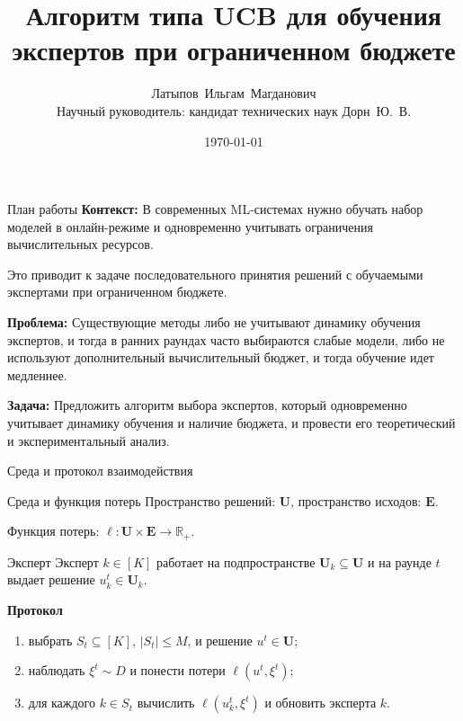 \documentclass[aspectratio=169]{beamer}
\title{Алгоритм типа UCB для обучения экспертов при ограниченном бюджете}
\author{
    Латыпов~Ильгам~Магданович\\
    \vspace{0.2cm}
    {\small Научный руководитель: кандидат технических наук Дорн~Ю.~В.}
}
\institute{
    Кафедра интеллектуальных систем ФПМИ МФТИ\\
    Специализация: Интеллектуальный анализ данных\\
    Направление: Информатика и вычислительная техника
}
\date{\today}
\begin{document}
\begin{frame}
  \titlepage
\end{frame}

\begin{frame}{План работы}
\small
\textbf{Контекст:} В современных ML-системах нужно обучать набор моделей в онлайн-режиме и одновременно учитывать ограничения вычислительных ресурсов.

Это приводит к задаче последовательного принятия решений с обучаемыми экспертами при ограниченном бюджете.

\vspace{0.2cm}
\textbf{Проблема:} Существующие методы либо не учитывают динамику обучения экспертов, и тогда в ранних раундах часто выбираются слабые модели, либо не используют дополнительный вычислительный бюджет, и тогда обучение идет медленнее.

\vspace{0.25cm}
\textbf{Задача:} Предложить алгоритм выбора экспертов, который одновременно учитывает динамику обучения и наличие бюджета, и провести его теоретический и экспериментальный анализ.
\end{frame}

\begin{frame}{Среда и протокол взаимодействия}
\small
\begin{block}{Среда и функция потерь}
Пространство решений: $\mathbf{U}$, пространство исходов: $\mathbf{E}$.

Функция потерь: $\ell:\mathbf{U}\times\mathbf{E}\to\mathbb{R}_+$.
\end{block}

\begin{block}{Эксперт}
Эксперт $k\in[K]$ работает на подпространстве $\mathbf{U}_k\subseteq\mathbf{U}$ и на раунде $t$ выдает решение $u_k^t\in\mathbf{U}_k$.
\end{block}

\begin{nframed}
\textbf{Протокол}
\begin{enumerate}
    \item выбрать $S_t\subseteq[K]$, $|S_t|\le M$, и решение $u^t\in\mathbf{U}$;
    \item наблюдать $\xi^t\sim D$ и понести потери $\ell(u^t,\xi^t)$;
    \item для каждого $k\in S_t$ вычислить $\ell(u_k^t,\xi^t)$ и обновить эксперта $k$.
\end{enumerate}
\end{nframed}
\end{frame}
\end{document}
